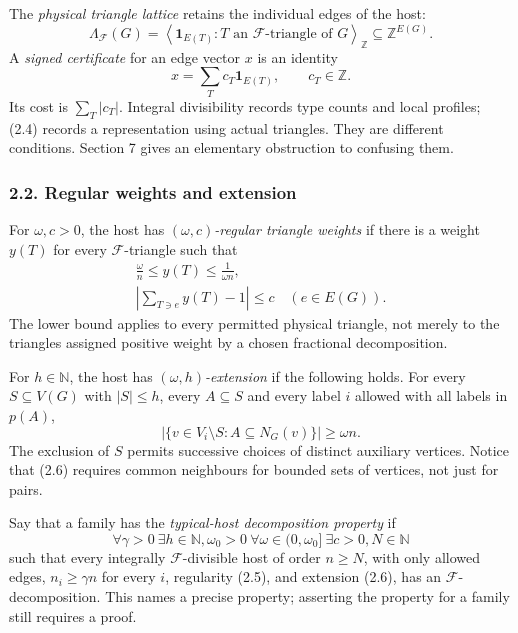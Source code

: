 \documentclass[english,11pt,a4paper]{article}
\begin{document}
The \emph{physical triangle lattice} retains the individual edges of the host: \[\Lambda_{\mathcal F}(G)
=\left\langle\mathbf1_{E(T)}:T\text{ an }\mathcal F\text{-triangle of }G\right\rangle_{\mathbb Z}
\subseteq\mathbb Z^{E(G)}.
\tag{2.3}\] A \emph{signed certificate} for an edge vector \(x\) is an identity \[x=\sum_T c_T\mathbf1_{E(T)},\qquad c_T\in\mathbb Z.
\tag{2.4}\] Its cost is \(\sum_T|c_T|\). Integral divisibility records type counts and local profiles; (2.4) records a representation using actual triangles. They are different conditions. Section 7 gives an elementary obstruction to confusing them.

\subsubsection{2.2. Regular weights and extension}\label{regular-weights-and-extension}

For \(\omega,c>0\), the host has \emph{\((\omega,c)\)-regular triangle weights} if there is a weight \(y(T)\) for every \(\mathcal F\)-triangle such that \[\begin{gathered}
\frac{\omega}{n}\le y(T)\le\frac1{\omega n},\\
\left|\sum_{T\ni e}y(T)-1\right|\le c
\quad(e\in E(G)).
\end{gathered}
\tag{2.5}\] The lower bound applies to every permitted physical triangle, not merely to the triangles assigned positive weight by a chosen fractional decomposition.

For \(h\in\mathbb N\), the host has \emph{\((\omega,h)\)-extension} if the following holds. For every \(S\subseteq V(G)\) with \(|S|\le h\), every \(A\subseteq S\) and every label \(i\) allowed with all labels in \(p(A)\), \[\left|\{v\in V_i\setminus S:A\subseteq N_G(v)\}\right|\ge\omega n.
\tag{2.6}\] The exclusion of \(S\) permits successive choices of distinct auxiliary vertices. Notice that (2.6) requires common neighbours for bounded sets of vertices, not just for pairs.

Say that a family has the \emph{typical-host decomposition property} if \[\forall\gamma>0\ \exists h\in\mathbb N,\omega_0>0\ 
\forall\omega\in(0,\omega_0]\ \exists c>0,N\in\mathbb N
\tag{2.7}\] such that every integrally \(\mathcal F\)-divisible host of order \(n\ge N\), with only allowed edges, \(n_i\ge\gamma n\) for every \(i\), regularity (2.5), and extension (2.6), has an \(\mathcal F\)-decomposition. This names a precise property; asserting the property for a family still requires a proof.
\end{document}
